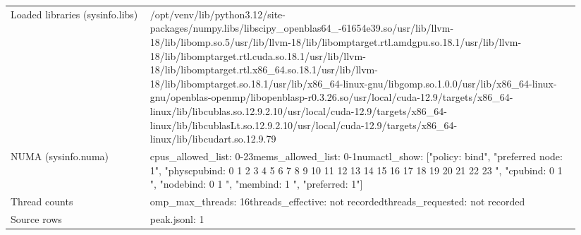 \begin{longtable}{>{\raggedright\arraybackslash}p{0.23\linewidth}>{\raggedright\arraybackslash}p{0.71\linewidth}}
Loaded libraries (sysinfo.libs) & /\allowbreak{}opt/\allowbreak{}venv/\allowbreak{}lib/\allowbreak{}python3.12/\allowbreak{}site-packages/\allowbreak{}numpy.libs/\allowbreak{}libscipy\_\allowbreak{}openblas64\_\allowbreak{}-61654e39.so\newline /\allowbreak{}usr/\allowbreak{}lib/\allowbreak{}llvm-18/\allowbreak{}lib/\allowbreak{}libomp.so.5\newline /\allowbreak{}usr/\allowbreak{}lib/\allowbreak{}llvm-18/\allowbreak{}lib/\allowbreak{}libomptarget.rtl.amdgpu.so.18.1\newline /\allowbreak{}usr/\allowbreak{}lib/\allowbreak{}llvm-18/\allowbreak{}lib/\allowbreak{}libomptarget.rtl.cuda.so.18.1\newline /\allowbreak{}usr/\allowbreak{}lib/\allowbreak{}llvm-18/\allowbreak{}lib/\allowbreak{}libomptarget.rtl.x86\_\allowbreak{}64.so.18.1\newline /\allowbreak{}usr/\allowbreak{}lib/\allowbreak{}llvm-18/\allowbreak{}lib/\allowbreak{}libomptarget.so.18.1\newline /\allowbreak{}usr/\allowbreak{}lib/\allowbreak{}x86\_\allowbreak{}64-linux-gnu/\allowbreak{}libgomp.so.1.0.0\newline /\allowbreak{}usr/\allowbreak{}lib/\allowbreak{}x86\_\allowbreak{}64-linux-gnu/\allowbreak{}openblas-openmp/\allowbreak{}libopenblasp-r0.3.26.so\newline /\allowbreak{}usr/\allowbreak{}local/\allowbreak{}cuda-12.9/\allowbreak{}targets/\allowbreak{}x86\_\allowbreak{}64-linux/\allowbreak{}lib/\allowbreak{}libcublas.so.12.9.2.10\newline /\allowbreak{}usr/\allowbreak{}local/\allowbreak{}cuda-12.9/\allowbreak{}targets/\allowbreak{}x86\_\allowbreak{}64-linux/\allowbreak{}lib/\allowbreak{}libcublasLt.so.12.9.2.10\newline /\allowbreak{}usr/\allowbreak{}local/\allowbreak{}cuda-12.9/\allowbreak{}targets/\allowbreak{}x86\_\allowbreak{}64-linux/\allowbreak{}lib/\allowbreak{}libcudart.so.12.9.79 \\
NUMA (sysinfo.numa) & cpus\_\allowbreak{}allowed\_\allowbreak{}list: 0-23\newline mems\_\allowbreak{}allowed\_\allowbreak{}list: 0-1\newline numactl\_\allowbreak{}show: ["policy: bind", "preferred node: 1", "physcpubind: 0 1 2 3 4 5 6 7 8 9 10 11 12 13 14 15 16 17 18 19 20 21 22 23 ", "cpubind: 0 1 ", "nodebind: 0 1 ", "membind: 1 ", "preferred: 1"] \\
Thread counts & omp\_\allowbreak{}max\_\allowbreak{}threads: 16\newline threads\_\allowbreak{}effective: not recorded\newline threads\_\allowbreak{}requested: not recorded \\
Source rows & peak.jsonl: 1 \\
\end{longtable}
